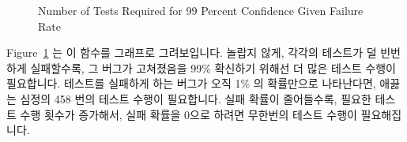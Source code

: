 \begin{figure}[tb]
\centering
{}
\caption{Number of Tests Required for 99 Percent Confidence Given Failure Rate}
\label{fig:debugging:Number of Tests Required for 99 Percent Confidence Given Failure Rate}
\end{figure}

Figure~\ref{fig:debugging:Number of Tests Required for 99 Percent Confidence Given Failure Rate}
는 이 함수를 그래프로 그려보입니다.
놀랍지 않게, 각각의 테스트가 덜 빈번하게 실패할수록, 그 버그가 고쳐졌음을 99\%
확신하기 위해선 더 많은 테스트 수행이 필요합니다.
테스트를 실패하게 하는 버그가 오직 1\% 의 확률만으로 나타난다면, 애끓는 심정의
458 번의 테스트 수행이 필요합니다.
실패 확률이 줄어들수록, 필요한 테스트 수행 횟수가 증가해서, 실패 확률을 0으로
하려면 무한번의 테스트 수행이 필요해집니다.


